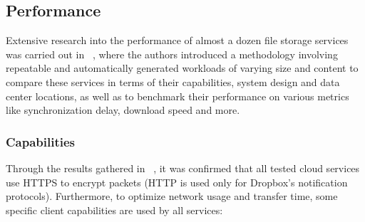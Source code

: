 \subsection{Performance}
Extensive research into the performance of almost a dozen file storage services was carried out in ~\cite{personal1}, where the authors introduced a methodology involving repeatable and automatically generated workloads of varying size and content  to compare these services in terms of their capabilities, system design and data center locations, as well as to benchmark their performance on various metrics like synchronization delay, download speed and more.

\subsubsection{Capabilities}
Through the results gathered in ~\cite{personal1}, it was confirmed that all tested cloud services use HTTPS to encrypt packets (HTTP is used only for Dropbox's notification protocols). Furthermore, to optimize network usage and transfer time, some specific client capabilities are used by all services:

